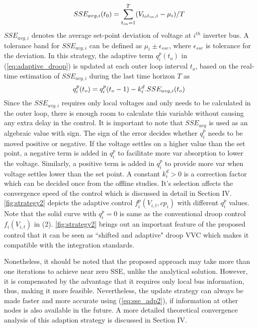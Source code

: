 \documentclass[journal]{IEEEtran}
\begin{document}
\setlength\abovedisplayskip{2pt}
\setlength\belowdisplayskip{4pt}
\begin{equation}
\small
\label{eq:sse_avg}
 SSE_{avg,i}(t_0)=\sum_{t_{in}=1}^{T}({V_{t_0t_{in},i}-\mu_i})/{T}
\end{equation}
$SSE_{avg,i}$ denotes the average set-point deviation of voltage at $i^{th}$ inverter bus. A tolerance band for $SSE_{avg,i}$ can be defined as $\mu_i\pm\epsilon_{sse}$, where $\epsilon_{sse}$ is tolerance for the deviation. In this strategy, the adaptive term $q_i^p (t_o)$ in (\ref{eq:adaptive_droop}) is updated at each outer loop interval $t_o$, based on the real-time estimation of $SSE_{avg,i}$ during the last time horizon $T$ as
\setlength\abovedisplayskip{4pt}
\setlength\belowdisplayskip{4pt}
\begin{equation}
\small
\label{eq:qp_update}
q^p_i (t_o )=q^p_i (t_o-1)-k_i^d.SSE_{avg,i}(t_o) 
\end{equation}
Since the $SSE_{avg,i}$ requires only local voltages and only needs to be calculated in the outer loop, there is enough room to calculate this variable without causing any extra delay in the control. It is important to note that {\small $SSE_{avg}$} is used as an algebraic value with sign. The sign of the error decides whether $q_i^p$ needs to be moved positive or negative. If the voltage settles on a higher value than the set point, a negative term is added in $q_i^p$ to facilitate more var absorption to lower the voltage. Similarly, a positive term is added in $q_i^p$ to provide more var when voltage settles lower than the set point. A constant {\small $k_i^d\!>\!0$} is a correction factor which can be decided once from the offline studies.
It's selection  affects the convergence speed of the control which is discussed in detail in Section IV.
\figurename \ref{fig:strategy2} depicts the adaptive control $f_i^p (V_{i,t},cp_i)$ with different $q_i^p$ values. Note that the solid curve with {$q_i^p\!=\!0$} is same as the conventional droop control $f_i (V_{i,t})$ in (2). \figurename \ref{fig:strategy2} brings out an important feature of the proposed control that it can be seen as ``shifted and adaptive" droop VVC which makes it compatible with the integration standards. 

{Nonetheless, it should be noted that the proposed approach may take more than one iterations to achieve near zero SSE, unlike the analytical solution. However, it is compensated by the advantage that it requires only local bus information, thus, making it more feasible. Nevertheless, the update strategy can always be made faster and more accurate using} (\ref{eq:sse_adp2}),{ if information at other nodes is also available in the future. A more detailed theoretical convergence analysis of this adaption strategy is discussed in Section IV.} 
\end{document}
